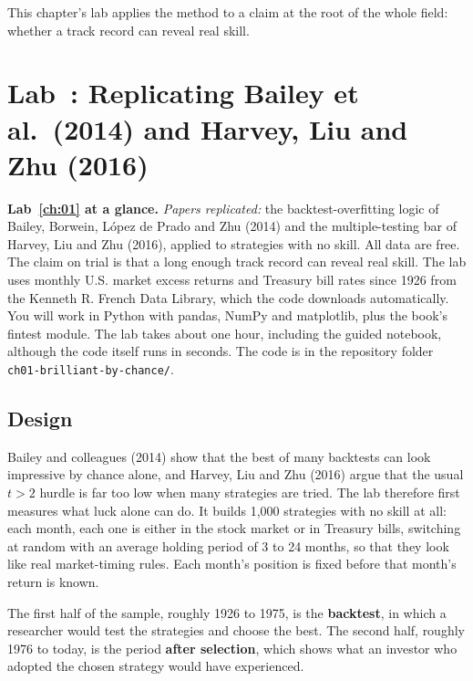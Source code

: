 This chapter's lab applies the method to a claim at the root of the whole field: whether a track record can reveal real skill.

\section{Lab~\thechapter: Replicating Bailey et al.\ (2014) and Harvey, Liu and Zhu (2016)}
\label{sec:01-lab}

\begin{callout}
\textbf{Lab~\ref{ch:01} at a glance.} \emph{Papers replicated:} the backtest-overfitting logic of Bailey, Borwein, L\'opez de Prado and Zhu (2014) and the multiple-testing bar of Harvey, Liu and Zhu (2016), applied to strategies with no skill. All data are free. The claim on trial is that a long enough track record can reveal real skill. The lab uses monthly U.S. market excess returns and Treasury bill rates since 1926 from the Kenneth R. French Data Library, which the code downloads automatically. You will work in Python with pandas, NumPy and matplotlib, plus the book's fintest module. The lab takes about one hour, including the guided notebook, although the code itself runs in seconds. The code is in the repository folder \texttt{ch01-brilliant-by-chance/}.
\end{callout}

\subsection*{Design}

Bailey and colleagues (2014) show that the best of many backtests can look impressive by chance alone, and Harvey, Liu and Zhu (2016) argue that the usual $t > 2$ hurdle is far too low when many strategies are tried. The lab therefore first measures what luck alone can do. It builds 1,000 strategies with no skill at all: each month, each one is either in the stock market or in Treasury bills, switching at random with an average holding period of 3 to 24 months, so that they look like real market-timing rules. Each month's position is fixed before that month's return is known.

The first half of the sample, roughly 1926 to 1975, is the \textbf{backtest}, in which a researcher would test the strategies and choose the best. The second half, roughly 1976 to today, is the period \textbf{after selection}, which shows what an investor who adopted the chosen strategy would have experienced.

